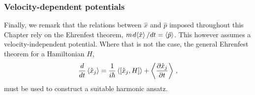 \subsubsection{Velocity-dependent potentials}

Finally, we remark that the relations between $\hat{x}$ and $\hat{p}$ imposed throughout this Chapter rely on the Ehrenfest theorem, $m \hspace*{0.3mm} d \hspace*{-0.6mm} \expval{\hat{x}} / dt = \expval{\hat{p}}$. This however assumes a velocity-independent potential. Where that is not the case, the general Ehrenfest theorem for a Hamiltonian $H$,
\begin{equation}
\frac{d }{dt} \expval{\hat{x}_j}= \frac{1}{i \hbar} \expval{\left[\hat{x}_j, H \right]} + \expval{\frac{\partial \hat{x}_j}{\partial t}}\,,
\end{equation}
must be used to construct a suitable harmonic ansatz. 